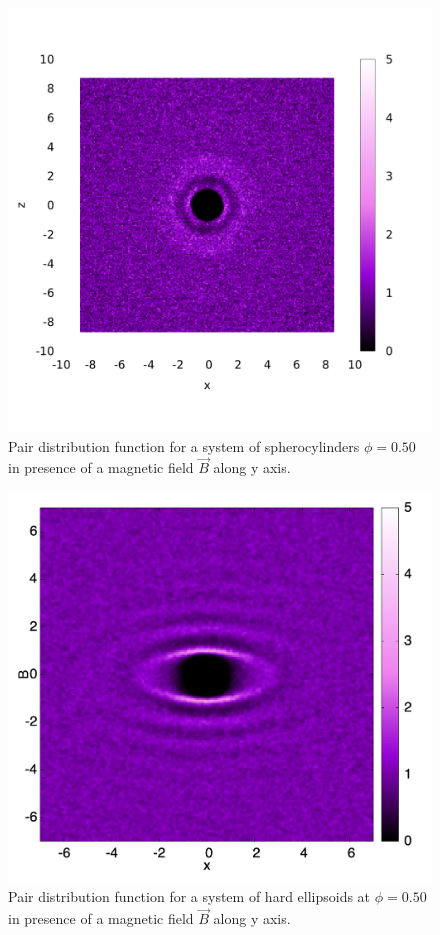 \documentclass[aip,graphicx]{revtex4-1} %
\begin{document}
\begin{figure}
    \centering
    \includegraphics[width=0.8\columnwidth]{gxz_B.png}
    \caption{Pair distribution function for a system of spherocylinders $\phi = 0.50$ in presence of a magnetic field $\vec{B}$ along y axis.}\label{fig:gxz_B}
\end{figure}

\begin{figure}
    \begin{center}
    \includegraphics[width=0.7\columnwidth]{gyz_B_HE.png}
    \caption{Pair distribution function for a system of hard ellipsoids at $\phi = 0.50$ in presence of a magnetic field $\vec{B}$ along y axis.}\label{fig:gyz_B_HE}
    \end{center}
\end{figure}
\end{document}
